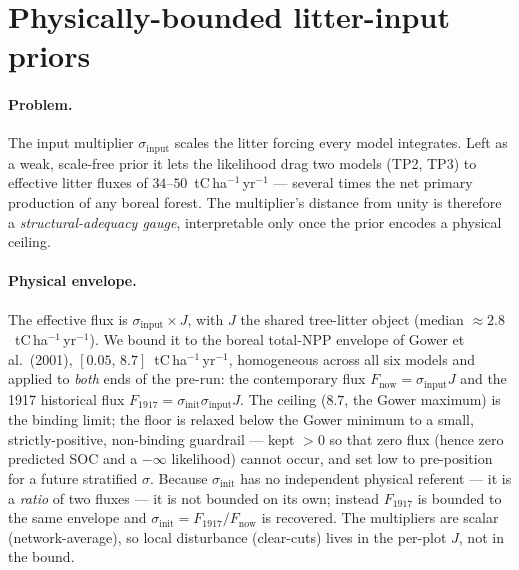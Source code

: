\documentclass[../HIKET_draft_v1.tex]{subfiles}
\begin{document}
\section{Physically-bounded litter-input priors}
\label{app:input-bounds}

\paragraph{Problem.} The input multiplier $\sigma_{\mathrm{input}}$ scales the
litter forcing every model integrates. Left as a weak, scale-free prior it lets
the likelihood drag two models (TP2, TP3) to effective litter fluxes of
$34$--$50$~tC\,ha$^{-1}$\,yr$^{-1}$ --- several times the net primary production of
any boreal forest. The multiplier's distance from unity is therefore a
\emph{structural-adequacy gauge}, interpretable only once the prior encodes a
physical ceiling.

\paragraph{Physical envelope.} The effective flux is
$\sigma_{\mathrm{input}}\times J$, with $J$ the shared tree-litter object (median
$\approx 2.8$~tC\,ha$^{-1}$\,yr$^{-1}$). We bound it to the boreal total-NPP
envelope of Gower et al.\ (2001), $[0.05,\,8.7]$~tC\,ha$^{-1}$\,yr$^{-1}$,
homogeneous across all six models and applied to \emph{both} ends of the pre-run:
the contemporary flux $F_{\mathrm{now}}=\sigma_{\mathrm{input}}J$ and the 1917
historical flux $F_{1917}=\sigma_{\mathrm{init}}\sigma_{\mathrm{input}}J$. The
ceiling ($8.7$, the Gower maximum) is the binding limit; the floor is relaxed
below the Gower minimum to a small, strictly-positive, non-binding guardrail ---
kept $>0$ so that zero flux (hence zero predicted SOC and a $-\infty$ likelihood)
cannot occur, and set low to pre-position for a future stratified $\sigma$.
Because $\sigma_{\mathrm{init}}$ has no independent physical referent --- it is a
\emph{ratio} of two fluxes --- it is not bounded on its own; instead $F_{1917}$ is
bounded to the same envelope and $\sigma_{\mathrm{init}}=F_{1917}/F_{\mathrm{now}}$
is recovered. The multipliers are scalar (network-average), so local disturbance
(clear-cuts) lives in the per-plot $J$, not in the bound.
\end{document}
